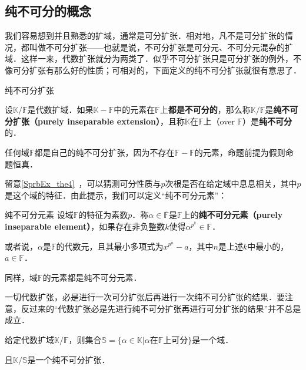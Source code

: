 


\subsection{纯不可分的概念}

我们容易想到并且熟悉的扩域，通常是可分扩张．相对地，凡不是可分扩张的情况，都叫做不可分扩张——也就是说，不可分扩张是可分元、不可分元混杂的扩域．这样一来，代数扩张就分为两类了．似乎不可分扩张只是可分扩张的例外，不像可分扩张有那么好的性质；可相对的，下面定义的纯不可分扩张就很有意思了．

\begin{definition}{纯不可分扩张}\label{PInsEx_def2}

设$\mathbb{K}/\mathbb{F}$是代数扩域．如果$\mathbb{K}-\mathbb{F}$中的元素在$\mathbb{F}$上\textbf{都是不可分的}，那么称$\mathbb{K}/\mathbb{F}$是\textbf{纯不可分扩张（purely inseparable extension）}，且称$\mathbb{K}$在$\mathbb{F}$上（over $\mathbb{F}$）是\textbf{纯不可分}的．

\end{definition}

任何域$\mathbb{F}$都是自己的纯不可分扩张，因为不存在$\mathbb{F}-\mathbb{F}$的元素，命题前提为假则命题恒真．

留意\autoref{SprbEx_the4}~，可以猜测可分性质与$p$次根是否在给定域中息息相关，其中$p$是这个域的特征．由此提示，我们可以定义“纯不可分元素”：


\begin{definition}{纯不可分元素}\label{PInsEx_def1}
设域$\mathbb{F}$的特征为素数$p$．称$\alpha\in\overline{\mathbb{F}}$是$\mathbb{F}$上的\textbf{纯不可分元素（purely inseparable element）}，如果存在非负整数$k$使得$\alpha^{p^k}\in\mathbb{F}$．

或者说，$\alpha$是$\mathbb{F}$的代数元，且其最小多项式为$x^{p^n}-a$，其中$n$是上述$k$中最小的，$a\in\mathbb{F}$．
\end{definition}

同样，域$\mathbb{F}$的元素都是纯不可分元素．



一切代数扩张，必是进行一次可分扩张后再进行一次纯不可分扩张的结果．要注意，反过来的“代数扩张必是先进行纯不可分扩张再进行可分扩张的结果”并不总是成立．




\begin{theorem}{}\label{PInsEx_the3}
给定代数扩域$\mathbb{K}/\mathbb{F}$，则集合$\mathbb{S}=\{\alpha\in\mathbb{K}|\alpha\text{在}\mathbb{F}\text{上可分}\}$是一个域．

且$\mathbb{K}/\mathbb{S}$是一个纯不可分扩张．
\end{theorem}

